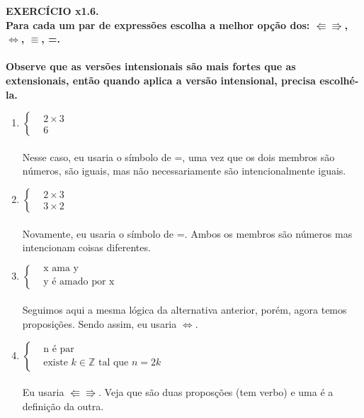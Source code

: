 \documentclass[a4paper, 12pt]{article}
\begin{document}
\noindent \textbf{EXERCÍCIO x1.6. \\
Para cada um par de expressões escolha a melhor opção dos:
$\Lleftarrow\Rrightarrow$, $\iff$, $\equiv$, =. \\ \\
Observe que as versões intensionais são mais fortes que as extensionais, então quando aplica a versão intensional, precisa escolhé-la.} \\
\begin{enumerate}
    \item $\left\{
    \begin{aligned}
    &2\times3 \\
    &6
    \end{aligned}
    \right.$ \\ \\
    Nesse caso, eu usaria o símbolo de =, uma vez que os dois membros são números, são iguais, mas não necessariamente são intencionalmente iguais. \\

    \item $\left\{
    \begin{aligned}
    &2\times3 \\
    &3\times2
    \end{aligned}
    \right.$ \\ \\
    Novamente, eu usaria o símbolo de =. Ambos os membros são números mas intencionam coisas diferentes. \\

    \item $\left\{
    \begin{aligned}
    &\textrm{x ama y}\\
    &\textrm{y é amado por x}
    \end{aligned}
    \right.$ \\ \\
    Seguimos aqui a mesma lógica da alternativa anterior, porém, agora temos proposições. Sendo assim, eu usaria $\iff$. \\

    \item $\left\{
    \begin{aligned}
    &\textrm{n é par}\\
    &\textrm{existe } k \in \mathbb{Z} \textrm{ tal que } n = 2k
    \end{aligned}
    \right.$ \\ \\
    Eu usaria $\Lleftarrow\Rrightarrow$. Veja que são duas proposções (tem verbo) e uma é a definição da outra. \\


\end{enumerate}
\end{document}
